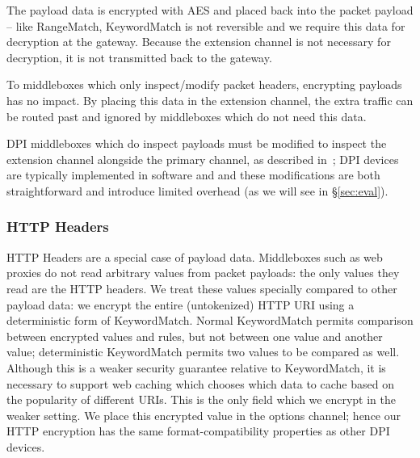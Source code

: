  The payload data is encrypted with AES and placed back into the packet payload -- like RangeMatch, KeywordMatch is not reversible and we require this data for decryption at the gateway.
Because the extension channel is not necessary for decryption, it is not transmitted back to the gateway.

 To middleboxes which only inspect/modify packet headers, encrypting payloads has no impact. 
By placing this data in the extension channel, the extra traffic can be routed past and ignored by middleboxes which do not need this data. %

DPI middleboxes which do inspect payloads must be modified to inspect the extension channel alongside the primary channel, as described in~\cite{blindbox}; DPI devices are typically implemented in software and and these modifications are both straightforward and introduce limited overhead (as we will see in \S\ref{sec:eval}). 

\subsubsection{HTTP Headers} 

HTTP Headers are a special case of payload data.
Middleboxes such as web proxies do not read arbitrary values from packet payloads: the only values they read are the HTTP headers.
We treat these values specially compared to other payload data: we encrypt the entire (untokenized) HTTP URI using a deterministic form of KeywordMatch.
Normal KeywordMatch permits comparison between encrypted values and rules, but not between one value and another value; deterministic KeywordMatch permits two values to be compared as well.
Although this is a weaker security guarantee relative to KeywordMatch, it is necessary to support web caching which chooses which data to cache based on the popularity of different URIs. This is the only field which we encrypt in the weaker setting.
We place this encrypted value in the options channel; hence our HTTP encryption has the same format-compatibility properties as other DPI devices.


